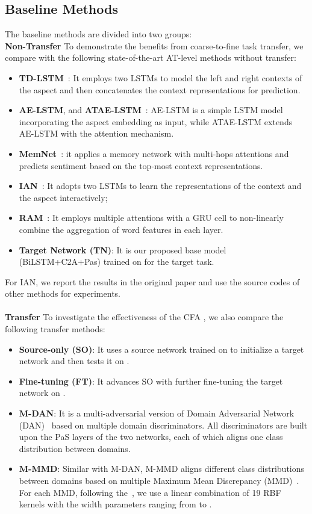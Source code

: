 \documentclass[letterpaper]{article} \usepackage{aaai19}  \usepackage{times}  \usepackage{latexsym}
\begin{document}
\vspace{-2mm}
\subsection{Baseline Methods}
The baseline methods are divided into two groups:\\
\noindent \textbf{Non-Transfer} To demonstrate the benefits from coarse-to-fine task transfer, we compare with the following state-of-the-art AT-level methods without transfer: 
\begin{itemize}
\item \textbf{TD-LSTM}~\cite{tang2015effective}: It employs two LSTMs to model the left and right contexts of the aspect and then concatenates the context representations for prediction.
\item \textbf{AE-LSTM}, and \textbf{ATAE-LSTM}~\cite{wang2016attention}: AE-LSTM is a simple LSTM model incorporating the aspect embedding as input, while ATAE-LSTM extends AE-LSTM with the attention mechanism.
\item \textbf{MemNet}~\cite{tang2016aspect}: it applies a memory network with multi-hops attentions and predicts sentiment based on the top-most context representations.

\item \textbf{IAN}~\cite{ma2017interactive}: It adopts two LSTMs to learn the representations of the context and the aspect interactively; 
\item \textbf{RAM}~\cite{chen2017recurrent}: It employs multiple attentions with a GRU cell to non-linearly combine the aggregation of word features in each layer. 
\item \textbf{Target Network (TN)}: It is our proposed base model (BiLSTM+C2A+Pas) trained on  for the target task.
\end{itemize}
For IAN, we report the results in the original paper and use the source codes of other methods for experiments. \vspace{-2mm}
\\\\
\noindent \textbf{Transfer} To investigate the effectiveness of the CFA , we also compare the following transfer methods:
\begin{itemize}
\item \textbf{Source-only (SO)}: It uses a source network trained on  to initialize a target network and then tests it on .
\item \textbf{Fine-tuning (FT)}: It advances SO with further fine-tuning the target network on .
\item \textbf{M-DAN}: It is a multi-adversarial version of Domain Adversarial Network (DAN)~\cite{ganin2016domain} based on multiple domain discriminators. All discriminators are built upon the PaS layers of the two networks, each of which aligns one class distribution between domains.
\item \textbf{M-MMD}: Similar with M-DAN, M-MMD aligns different class distributions between domains based on multiple Maximum Mean Discrepancy (MMD)~\cite{gretton2007kernel}. For each MMD, 
following the~\cite{bousmalis2016domain}, 
we use a linear combination of 19 RBF kernels with the width parameters ranging from  to .
\end{itemize}
\end{document}

